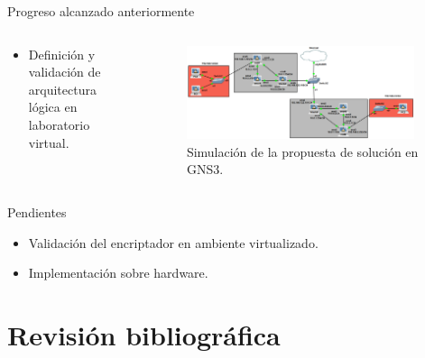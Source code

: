 \documentclass[serif, aspectratio=169]{beamer}
\begin{document}
\begin{frame}{Progreso alcanzado anteriormente}
    \begin{columns}
    \begin{column}{0.33\textwidth}

    \begin{itemize}
        \item Definición y validación de arquitectura lógica en laboratorio virtual.
    \end{itemize}

    \end{column}
    \begin{column}{0.7\textwidth}
    \begin{figure}
        \centering
        \includegraphics[width=0.95\textwidth]{images/gns3_2.png}
        \caption{Simulación de la propuesta de solución en GNS3.} 
    \end{figure}
    \end{column}
\end{columns}
\end{frame}

\begin{frame}{Pendientes}
    \begin{itemize}
        \item Validación del encriptador en ambiente virtualizado. 
        \item Implementación sobre hardware.
    \end{itemize}

\end{frame}

\section{Revisión bibliográfica}
\end{document}
